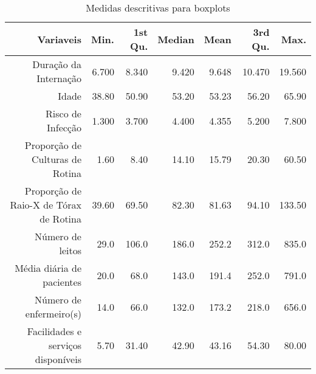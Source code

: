 


\begin{table}[ht]
\centering
\caption{ Medidas descritivas para boxplots\label{tab:deescritiva}}
\begin{tabular}{rrrrrrr}
\hline
Variaveis 
&  Min. & 1st Qu. & Median  &  Mean & 3rd Qu. &  Max.  \\
\hline
Duração da Internação
&  6.700 & 8.340 &  9.420 &  9.648 & 10.470 &  19.560\\
Idade
&  38.80 & 50.90 & 53.20 &  53.23 &  56.20 &  65.90\\
Risco de Infecção
& 1.300 & 3.700 & 4.400 & 4.355 &  5.200 &  7.800\\ 
Proporção de Culturas de Rotina
& 1.60 & 8.40 & 14.10 & 15.79 & 20.30 &  60.50\\ 
Proporção de Raio-X de Tórax de Rotina
&  39.60 & 69.50 & 82.30 &  81.63 &  94.10 &  133.50\\ 
Número de leitos
&  29.0 & 106.0 & 186.0 &  252.2 &  312.0 &  835.0\\ 
Média diária de pacientes
&  20.0 & 68.0 & 143.0 &  191.4 &  252.0 & 791.0\\ 
Número de enfermeiro(s)
&  14.0 & 66.0 & 132.0 &  173.2 &  218.0 & 656.0\\ 
Facilidades e serviços disponíveis
&  5.70 & 31.40 & 42.90 &  43.16 & 54.30 & 80.00\\ 
\hline
\end{tabular}
\end{table}
